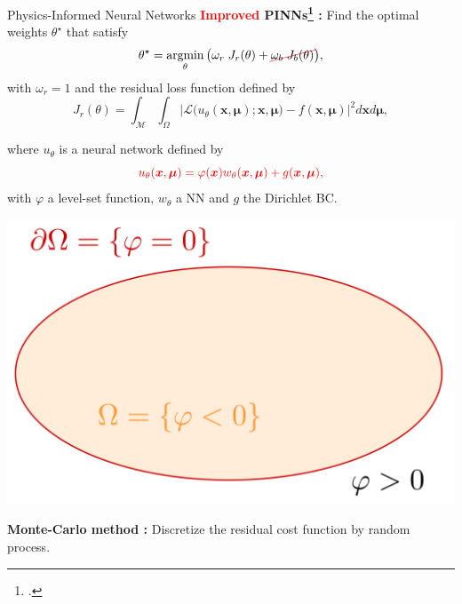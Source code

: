 \begin{frame}[noframenumbering]{Physics-Informed Neural Networks}
	\textbf{\textcolor{red}{Improved} PINNs\footcite{LagLikFot1998,FraMicNav2024} :} Find the optimal weights $\theta^\star$ that satisfy
	\begin{equation}
		\label{eq:opt_pb_nobc}
		\theta^\star = \argmin_{\theta}	\big( \omega_r \; J_r(\theta) + \Ccancel[red]{\omega_b \; J_b(\theta)} \big),
	\end{equation}
	with $\omega_r=1$ and the residual loss function defined by
	\begin{equation*}
		J_r(\theta) =
		\int_{\mathcal{M}}\int_{\Omega}
		\big| \mathcal{L}\big(u_\theta(\bm{x},\bm{\mu});\bm{x},\bm{\mu}\big)-f(\bm{x},\bm{\mu}) \big|^2 d\bm{x} d\bm{\mu},
	\end{equation*}
	\begin{minipage}{0.7\linewidth}
		where $u_\theta$ is a neural network defined by
		\begin{equation*}
			\textcolor{red}{u_{\theta}(\bm{x},\bm{\mu}) = \varphi(\bm{x}) w_{\theta}(\bm{x},\bm{\mu}) + g(\bm{x},\bm{\mu}),}
		\end{equation*}
		with $\varphi$ a level-set function, $w_\theta$ a NN and $g$ the Dirichlet BC. 
	\end{minipage}
	\begin{minipage}{0.28\linewidth}
		\vspace{-15pt}
		\includegraphics[width=0.95\linewidth]{images/intro/levelset.png}
	\end{minipage}

	\vspace{5pt}
	\textbf{Monte-Carlo method :} Discretize the residual cost function by random process.
	\vspace{15pt}
\end{frame}


